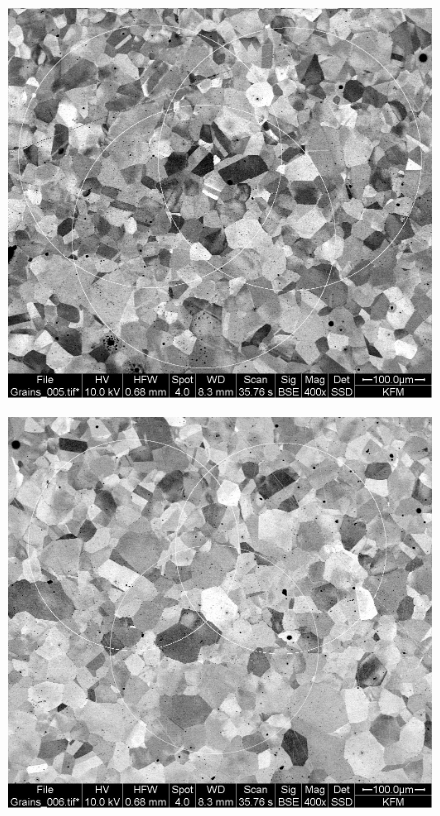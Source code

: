 \begin{figure}[!h]
    \centering
    \begin{minipage}[b]{0.48\linewidth}
        \centering
        \includegraphics[width=\linewidth]{A18 - SEM/Grains_005_circ.jpg}
        \label{fig:img1}
    \end{minipage}
    \hfill
    \begin{minipage}[b]{0.48\linewidth}
        \centering
        \includegraphics[width=\linewidth]{A18 - SEM/Grains_006_circ.jpg}
        \label{fig:img2}
    \end{minipage}
    

\end{figure}
